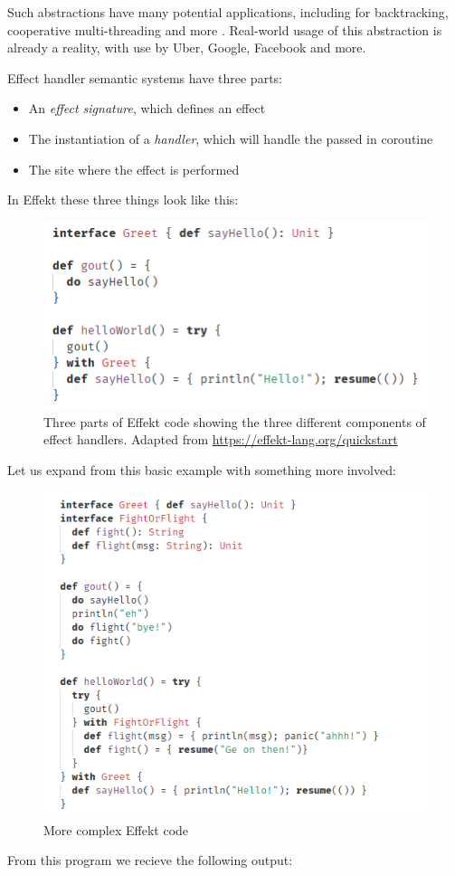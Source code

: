 \documentclass[logo,bsc,singlespacing,parskip,online]{infthesis}
\begin{document}
Such abstractions have many potential applications, including for backtracking, cooperative multi-threading and more \citep{effect_handlers_tutorial}. Real-world usage of this abstraction is already a reality, with use by Uber, Google, Facebook and more. \citep{impact_study}

Effect handler semantic systems have three parts:
\begin{itemize}
\item An \textit{effect signature}, which defines an effect
\item The instantiation of a \textit{handler}, which will handle the passed in coroutine
\item The site where the effect is performed
\end{itemize}

In Effekt \citep{effekt-paper} these three things look like this:

\begin{figure}[h]
    \centering
    \includegraphics[width=0.5\linewidth]{basic_demo.png}
    \caption{Three parts of Effekt code showing the three different components of effect handlers. Adapted from \url{https://effekt-lang.org/quickstart}}
    \label{fig:basic}
\end{figure}

Let us expand from this basic example with something more involved:

\begin{figure}[h]
    \centering
    \includegraphics[width=0.9\linewidth]{effekt_2.png}
    \caption{More complex Effekt code}
    \label{fig:efkt2}
\end{figure}
\pagebreak
From this program we recieve the following output:
\end{document}
